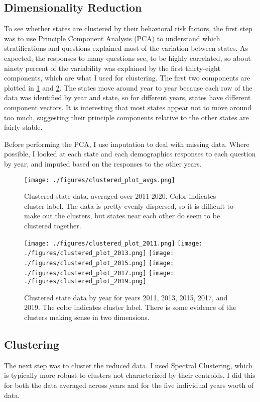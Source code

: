 \documentclass[11pt]{article}
\begin{document}
\subsection{Dimensionality Reduction}
To see whether states are clustered by their behavioral risk factors, the first step was to use Principle Component Analysis (PCA) to understand which stratifications and questions explained most of the variation between states. As expected, the responses to many questions see, to be highly correlated, so about ninety percent of the variability was explained by the first thirty-eight components, which are what I used for clustering. The first two components are plotted in  \ref{fig:clustered_avgs} and \ref{fig:clustered_data}. The states move around year to year because each row of the data was identified by year and state, so for different years, states have different component vectors. It is interesting that most states appear not to move around too much, suggesting their principle components relative to the other states are fairly stable.

Before performing the PCA, I use imputation to deal with missing data. Where possible, I looked at each state and each demographics responses to each question by year, and imputed based on the responses to the other years.

\begin{figure}[htbp]
\centering
\texttt{[image: ./figures/clustered\_plot\_avgs.png]}
\caption{\label{fig:clustered_avgs}
  Clustered state data, averaged over 2011-2020. Color indicates cluster label. The data is pretty evenly dispersed, so it is difficult to make out the clusters, but states near each other do seem to be clustered together.
}
\end{figure}

\begin{figure}[hp]
\texttt{[image: ./figures/clustered\_plot\_2011.png]}
\texttt{[image: ./figures/clustered\_plot\_2013.png]}
\texttt{[image: ./figures/clustered\_plot\_2015.png]}
\texttt{[image: ./figures/clustered\_plot\_2017.png]}
\texttt{[image: ./figures/clustered\_plot\_2019.png]}
\caption{\label{fig:clustered_data}
  Clustered state data by year for years 2011, 2013, 2015, 2017, and 2019. The color indicates cluster label. There is some evidence of the clusters making sense in two dimensions.
}
\end{figure}

\subsection{Clustering}
The next step was to cluster the reduced data. I used Spectral Clustering, which is typically more robust to clusters not characterized by their centroids. I did this for both the data averaged across years and for the five individual years worth of data. 
\end{document}
